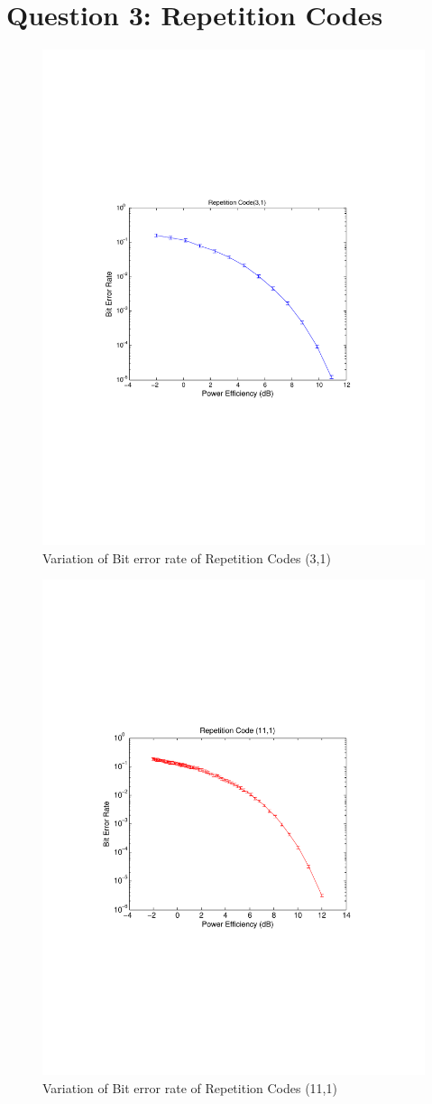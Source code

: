 \documentclass[11pt, english]{article}
\begin{document}
\section{Question 3: Repetition Codes}
\begin{figure}[H]
    \centering
    \includegraphics[width=.8\textwidth]{repetition_3_1.pdf}
    \caption{Variation of Bit error rate of Repetition Codes (3,1)}
    \label{rl3}
\end{figure}

\begin{figure}[H]
    \centering
    \includegraphics[width=.8\textwidth]{repetition_11_1.pdf}
    \caption{Variation of Bit error rate of Repetition Codes (11,1)}
    \label{rl11}
\end{figure}
\end{document}
